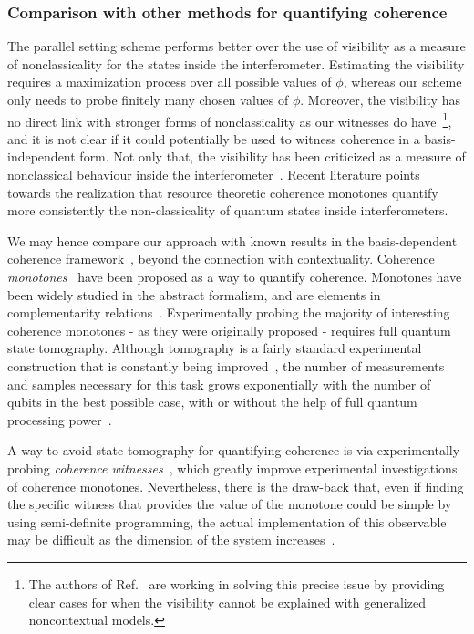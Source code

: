 \documentclass[letterpaper,onecolumn,12pt,accepted=2024-01-17]{article}
\begin{document}
\subsubsection{Comparison with other methods for quantifying coherence}
The parallel setting scheme performs better over the use of visibility as a measure of nonclassicality for the states inside the interferometer. Estimating the visibility requires a maximization process over all possible values of $\phi$, whereas our scheme only needs to probe finitely many chosen values of $\phi$. Moreover, the visibility has no direct link with stronger forms of nonclassicality as our witnesses do have~\footnote{The authors of Ref.~\cite{catani2021interference} are working in solving this precise issue by providing clear cases for when the visibility cannot be explained with generalized noncontextual models.}, and it is not clear if it could potentially be used to witness coherence in a basis-independent form. Not only that, the visibility has been criticized as a measure of nonclassical behaviour inside the interferometer~\cite{chrysosthemos_quantum_2022}. Recent literature points towards the realization that resource theoretic coherence monotones quantify more consistently the non-classicality of quantum states inside interferometers.


We may hence compare our approach with known results in the basis-dependent coherence framework~\cite{baumgratz2014quantifying,wu2021experimental}, beyond the connection with contextuality. Coherence \textit{monotones}~\cite{Streltsov17,wu2021experimental} have been proposed as a way to quantify coherence. Monotones have been widely studied in the abstract formalism, and are elements in complementarity relations~\cite{Streltsov17,wu2021experimental}. Experimentally probing the majority of interesting coherence monotones - as they were originally proposed - requires full quantum state tomography. Although tomography is a fairly standard experimental construction that is constantly being improved~\cite{rambach2021robust}, the number of measurements and samples necessary for this task grows exponentially with the number of qubits in the best possible case, with or without the help of full quantum processing power~\cite{chen2022tight}. 

A way to avoid state tomography for quantifying coherence is via experimentally probing \textit{coherence witnesses}~\cite{zhang2018estimating,wu2021experimental,napoli2016robustness,wang2017directly}, which greatly improve experimental investigations of coherence monotones. Nevertheless, there is the draw-back that, even if finding the specific witness that provides the value of the monotone could be simple by using semi-definite programming, the actual implementation of this observable may be difficult as the dimension of the system increases~\cite{zheng2018experimental}. 
\end{document}
